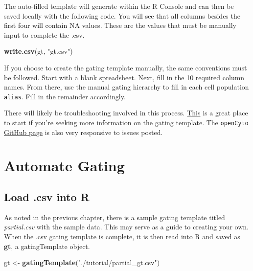 \documentclass[]{book}
\newenvironment{Shaded}{\begin{snugshade}}{\end{snugshade}}
\newcommand{\KeywordTok}[1]{\textcolor[rgb]{0.13,0.29,0.53}{\textbf{#1}}}
\newcommand{\NormalTok}[1]{#1}
\newcommand{\StringTok}[1]{\textcolor[rgb]{0.31,0.60,0.02}{#1}}
\begin{document}
The auto-filled template will generate within the R Console and can then be saved locally with the following code. You will see that all columns besides the first four will contain NA values. These are the values that must be manually input to complete the .csv.

\begin{Shaded}
\begin{Highlighting}[]
\KeywordTok{write.csv}\NormalTok{(gt, }\StringTok{"gt.csv"}\NormalTok{)}
\end{Highlighting}
\end{Shaded}

If you choose to create the gating template manually, the same conventions must be followed. Start with a blank spreadsheet. Next, fill in the 10 required column names. From there, use the manual gating hierarchy to fill in each cell population \texttt{alias}. Fill in the remainder accordingly.

There will likely be troubleshooting involved in this process. \href{https://www.bioconductor.org/packages/devel/bioc/vignettes/openCyto/inst/doc/HowToWriteCSVTemplate.html\#14_gating_method_that_generates_multiple_populations}{This} is a great place to start if you're seeking more information on the gating template. The \texttt{openCyto} \href{https://github.com/RGLab/openCyto}{GitHub page} is also very responsive to issues posted.

\hypertarget{automate-gating}{%
\chapter{Automate Gating}\label{automate-gating}}

\hypertarget{load-.csv-into-r}{%
\section{Load .csv into R}\label{load-.csv-into-r}}

As noted in the previous chapter, there is a sample gating template titled \emph{partial.csv} with the sample data. This may serve as a guide to creating your own. When the .csv gating template is complete, it is then read into R and saved as \textbf{gt}, a gatingTemplate object.

\begin{Shaded}
\begin{Highlighting}[]
\NormalTok{gt <-}\StringTok{ }\KeywordTok{gatingTemplate}\NormalTok{(}\StringTok{"./tutorial/partial_gt.csv"}\NormalTok{)}
\end{Highlighting}
\end{Shaded}
\end{document}
